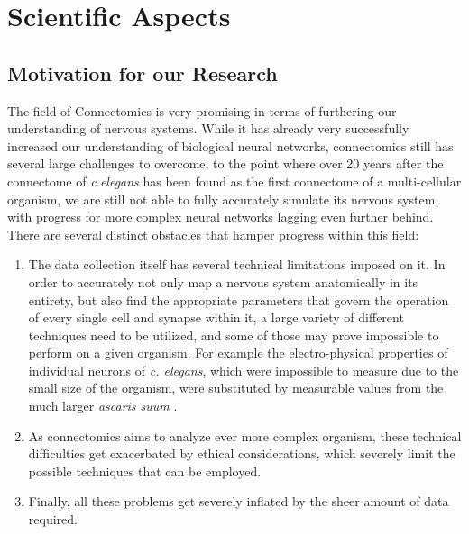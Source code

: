 \documentclass[a4paper,11pt]{article}
\begin{document}


\newpage
%
%
\vspace{\baselineskip}
\vspace*{10mm}
\tableofcontents
\newpage
%
%
\section{Scientific Aspects}
\subsection{Motivation for our Research}

The field of Connectomics is very promising in terms of furthering our understanding of nervous systems. While it has already very successfully increased our understanding of biological neural networks, connectomics still has several large challenges to overcome, to the point where over 20 years after the connectome of \emph{c.elegans} has been found as the first connectome of a multi-cellular organism, we are still not able to fully accurately simulate its nervous system, with progress for more complex neural networks lagging even further behind. There are several distinct obstacles that hamper progress within this field:
\begin{enumerate}
\item The data collection itself has several technical limitations imposed on it. In order to accurately not only map a nervous system anatomically in its entirety, but also find the appropriate parameters that govern the operation of every single cell and synapse within it, a large variety of different techniques need to be utilized, and some of those may prove impossible to perform on a given organism. For example the electro-physical properties of individual neurons of \emph{c. elegans}, which were impossible to measure due to the small size of the organism, were substituted by measurable values from the much larger \emph{ascaris suum} \citep{ThatBlueBook}.
\item As connectomics aims to analyze ever more complex organism, these technical difficulties get exacerbated by ethical considerations, which severely limit the possible techniques that can be employed.
\item Finally, all these problems get severely inflated by the sheer amount of data required.
\end{enumerate}
\end{document}
